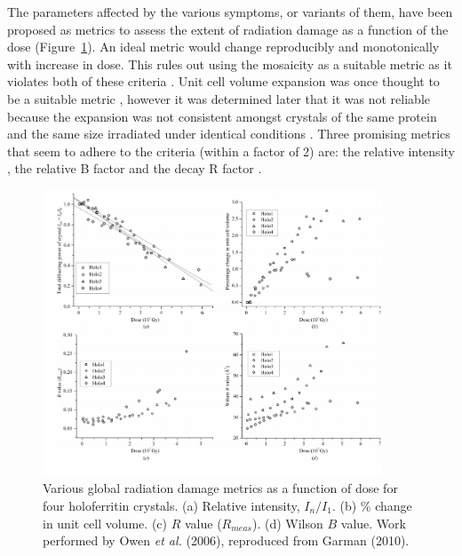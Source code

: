        The parameters affected by the various symptoms, or variants of them, have been proposed as metrics to assess the extent of radiation damage as a function of the dose (Figure~\ref{fig:Radiation damage metrics}).
        An ideal metric would change reproducibly and monotonically with increase in dose.
        This rules out using the mosaicity as a suitable metric as it violates both of these criteria \cite{garman2010}.
        Unit cell volume expansion was once thought to be a suitable metric \cite{ravelli2002}, however it was determined later that it was not reliable because the expansion was not consistent amongst crystals of the same protein and the same size irradiated under identical conditions \cite{murray2002}.
        Three promising metrics that seem to adhere to the criteria (within a factor of 2) are: the relative intensity \cite{owen2006}, the relative B factor \cite{kmetko2006} and the decay R factor \cite{diederichs2006}.

        \begin{figure}
            \centering
            \includegraphics[width=0.9\textwidth]{figures/introduction/raddammetrics.png}
            \caption[Global radiation damage metrics]{Various global radiation damage metrics as a function of dose for four holoferritin crystals.
            (a) Relative intensity, $I_n/I_1$.
            (b) \% change in unit cell volume.
            (c) $R$ value ($R_{meas}$).
            (d) Wilson $B$ value.
            Work performed by Owen \textit{et al.} (2006), reproduced from Garman (2010).}
            \label{fig:Radiation damage metrics}
        \end{figure}

